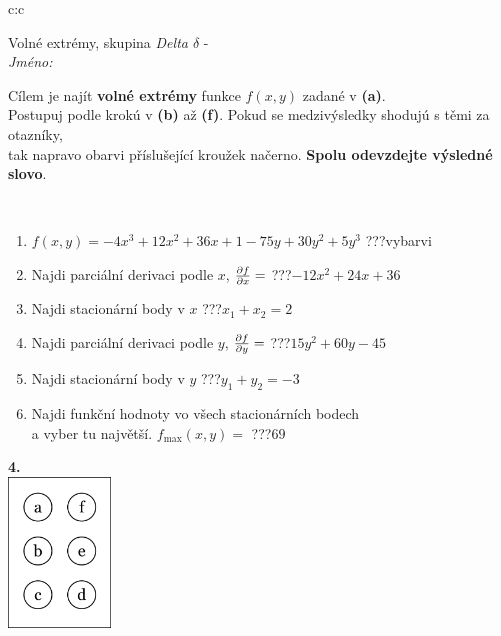 \documentclass[10pt]{report}
\begin{document}
\begin{tabular}{c:c}
\begin{minipage}[c][104.5mm][t]{0.5\linewidth}
\begin{center}
\vspace{7mm}
{\huge Volné extrémy, skupina \textit{Delta $\delta$} -}\\[5mm]
\textit{Jméno:}\phantom{xxxxxxxxxxxxxxxxxxxxxxxxxxxxxxxxxxxxxxxxxxxxxxxxxxxxxxxxxxxxxxxxx}\\[5mm]
\begin{minipage}{0.95\linewidth}
\begin{center}
Cílem je najít \textbf{volné extrémy} funkce $f(x,y)$ zadané v \textbf{(a)}.\\Postupuj podle krokú v \textbf{(b)} až \textbf{(f)}. Pokud se medzivýsledky shodujú s těmi za otazníky,\\tak napravo obarvi příslušející kroužek načerno. \textbf{Spolu odevzdejte výsledné slovo}.
\end{center}
\end{minipage}
\\[1mm]
\begin{minipage}{0.79\linewidth}
\begin{center}
\begin{varwidth}{\linewidth}
\begin{enumerate}
\normalsize
\item $f(x,y)=-4x^3+12x^2+36x+1-75y+30y^2+5y^3$\quad \dotfill\; ???\;\dotfill \quad vybarvi
\item Najdi parciální derivaci podle $x$, $\pdv{f}{x}=$\quad \dotfill\; ???\;\dotfill \quad $-12x^2+24x+36$
\item Najdi stacionární body v $x$\quad \dotfill\; ???\;\dotfill \quad $x_1+x_2=2$
\item Najdi parciální derivaci podle $y$, $\pdv{f}{y}=$\quad \dotfill\; ???\;\dotfill \quad $15y^2+60y-45$
\item Najdi stacionární body v $y$\quad \dotfill\; ???\;\dotfill \quad $y_1+y_2=-3$
\item Najdi funkční hodnoty vo všech stacionárních bodech \\ \phantom{xxxxxx} a vyber tu najvětší. $f_{\text{max}}(x,y)=$\quad \dotfill\; ???\;\dotfill \quad $69$
\end{enumerate}
\end{varwidth}
\end{center}
\end{minipage}
\begin{minipage}{0.20\linewidth}
\begin{center}
{\Huge\bfseries 4.} \\[2mm]
\includegraphics[height=40mm]{../images/braille.png}

\end{center}
\end{minipage}
\end{center}
\end{minipage}
\end{tabular}
\end{document}

